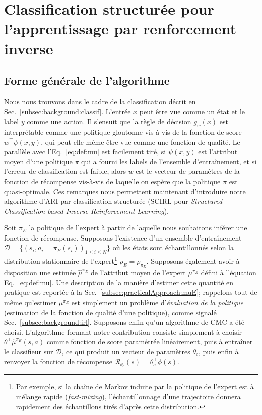 \documentclass[english,utf8]{./hermes-journal}
\newcommand{\R}{\mathcal{R}}
\newcommand{\D}{\mathcal{D}}
\begin{document}
\section{Classification structurée pour l'apprentissage par renforcement inverse} \label{sec:scirl}

\subsection{Forme générale de l'algorithme}
\label{subsec:scirl:algo}

Nous nous trouvons dans le cadre de la classification décrit en Sec.~\ref{subsec:background:classif}. L'entrée $x$ peut être vue comme un état et le label $y$ comme une action. Il s'ensuit que la règle de décision 
$g_w(x)$ est interprétable comme une politique gloutonne vis-à-vis de la fonction de score $w^\top \psi(x,y)$, qui peut elle-même être vue comme une fonction de qualité. Le parallèle avec l'Eq.~\eqref{eq:def:mu} est facilement tiré, si $\psi(x,y)$ est l'attribut moyen d'une politique $\pi$ qui a fourni les labels de l'ensemble d'entraînement, et si l'erreur de classification est faible, alors $w$ est le vecteur de paramètres de la fonction de récompense vis-à-vis de laquelle on espère que la politique $\pi$ est quasi-optimale. 
Ces remarques nous permettent maintenant d'introduire notre algorithme d'ARI par classification structurée (SCIRL pour \emph{Structured Classification-based Inverse Reinforcement Learning}).

Soit $\pi_E$ la politique de l'expert à partir de laquelle nous souhaitons inférer une fonction de récompense. Supposons l'existence d'un ensemble d'entraînement $\D = \{(s_i,a_i=\pi_E(s_i))_{1\leq i\leq N}\}$ où les états sont échantillonnés selon la distribution stationnaire de l'expert\footnote{Par exemple, si la chaîne de Markov induite par la politique de l'expert est à mélange rapide (\emph{fast-mixing}), l'échantillonnage d'une trajectoire donnera rapidement des échantillons tirés d'après cette distribution.} $\rho_E = \rho_{\pi_E}$.
Supposons également avoir à disposition une estimée $\hat{\mu}^{\pi_E}$ de l'attribut moyen de l'expert $\mu^{\pi_E}$ défini à l'équation Eq.~\eqref{eq:def:mu}. Une description de la manière d'estimer cette quantité en pratique est reportée à la Sec.~\ref{subsec:practicalApproach:muE}; rappelons tout de même qu'estimer $\mu^{\pi_E}$ est simplement un problème d'\emph{évaluation de la politique} (estimation de la fonction de qualité d'une politique), comme signalé Sec.~\ref{subsec:background:irl}. Supposons enfin qu'un algorithme de CMC a été choisi. L'algorithme formant notre contribution consiste simplement à choisir $\theta^\top\hat{\mu}^{\pi_E}(s,a)$ comme fonction de score paramétrée linéairement, puis à entraîner le classifieur sur $\D$, ce qui produit un vecteur de paramètres $\theta_c$, puis enfin à renvoyer la fonction de récompense $\R_{\theta_c}(s) = \theta_c^\top \phi(s)$.
\end{document}
